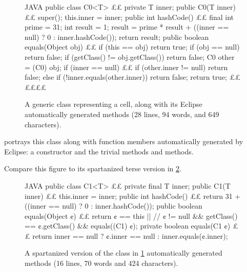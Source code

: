 \begin{figure}[H]
  \caption{\label{figure:cell0}%
    A generic class representing a cell, along with its Eclipse
  automatically generated methods (28 lines, 94 words, and 649 characters).}
    \begin{adjustbox}{max width=\columnwidth}
\begin{code}[minipage, width=1.25\columnwidth]{JAVA}
public class C0<T> {££
  private T inner;
  public C0(T inner) {££
    super();
    this.inner = inner;
  }
  public int hashCode() {££
    final int prime = 31;
    int result = 1;
    result = prime * result + ((inner == null) ? 0 : inner.hashCode());
    return result;
  }
  public boolean equals(Object obj) {££
    if (this == obj)
      return true;
    if (obj == null)
      return false;
    if (getClass() != obj.getClass())
      return false;
    C0 other = (C0) obj;
    if (inner == null) {££
      if (other.inner != null)
        return false;
    } else if (!inner.equals(other.inner))
      return false;
    return true;
  }££
}££££
\end{code}
\end{adjustbox}
\end{figure}

 portrays this class along with function members
automatically generated by Eclipse: a constructor and the trivial methods
 and  methods.

Compare this figure to its spartanized terse version in \cref{figure:cell1}.

\begin{figure}[H]
  \caption{\label{figure:cell1}%
    A spartanized version of the \Java class in \cref{figure:cell0}
    automatically generated methods (16 lines, 70 words and 424 characters).}
    \begin{adjustbox}{max width=\columnwidth}
\begin{code}[minipage, width=1.25\columnwidth]{JAVA}
public class C1<T> {££
  private final T inner;
  public C1(T inner) {££
    this.inner = inner;
  }
  public int hashCode() {££
    return 31 + ((inner == null) ? 0 : inner.hashCode());
  }
  public boolean equals(Object ¢) {££
    return ¢ == this || //
      ¢ != null && getClass() == ¢.getClass() && equals((C1) ¢);
  }
  private boolean equals(C1 ¢) {££
    return inner == null ? ¢.inner == null : inner.equals(¢.inner);
  }
}
\end{code}
\end{adjustbox}
\end{figure}

